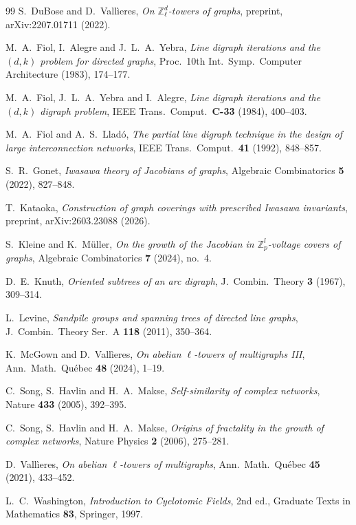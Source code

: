 \documentclass[11pt]{article}
\theoremstyle{plain}
\theoremstyle{remark}
\newcommand{\Z}{\mathbb{Z}}
\begin{document}
\begin{thebibliography}{99}
 S.~DuBose and D.~Vall\`ieres,
\emph{On $\Z_\ell^{d}$-towers of graphs}, preprint, arXiv:2207.01711 (2022).

 M.~A.~Fiol, I.~Alegre and J.~L.~A.~Yebra,
\emph{Line digraph iterations and the $(d,k)$ problem for directed graphs},
Proc.\ 10th Int.\ Symp.\ Computer Architecture (1983), 174--177.

 M.~A.~Fiol, J.~L.~A.~Yebra and I.~Alegre,
\emph{Line digraph iterations and the $(d,k)$ digraph problem},
IEEE Trans.\ Comput.\ \textbf{C-33} (1984), 400--403.

 M.~A.~Fiol and A.~S.~Llad\'o,
\emph{The partial line digraph technique in the design of large interconnection networks},
IEEE Trans.\ Comput.\ \textbf{41} (1992), 848--857.

 S.~R.~Gonet,
\emph{Iwasawa theory of Jacobians of graphs},
Algebraic Combinatorics \textbf{5} (2022), 827--848.

 T.~Kataoka,
\emph{Construction of graph coverings with prescribed Iwasawa invariants},
preprint, arXiv:2603.23088 (2026).

 S.~Kleine and K.~M\"uller,
\emph{On the growth of the Jacobian in $\Z_p^{l}$-voltage covers of graphs},
Algebraic Combinatorics \textbf{7} (2024), no.~4.

 D.~E.~Knuth,
\emph{Oriented subtrees of an arc digraph},
J.\ Combin.\ Theory \textbf{3} (1967), 309--314.

 L.~Levine,
\emph{Sandpile groups and spanning trees of directed line graphs},
J.\ Combin.\ Theory Ser.~A \textbf{118} (2011), 350--364.

 K.~McGown and D.~Vall\`ieres,
\emph{On abelian $\ell$-towers of multigraphs III},
Ann.\ Math.\ Qu\'ebec \textbf{48} (2024), 1--19.

 C.~Song, S.~Havlin and H.~A.~Makse,
\emph{Self-similarity of complex networks},
Nature \textbf{433} (2005), 392--395.

 C.~Song, S.~Havlin and H.~A.~Makse,
\emph{Origins of fractality in the growth of complex networks},
Nature Physics \textbf{2} (2006), 275--281.

 D.~Vall\`ieres,
\emph{On abelian $\ell$-towers of multigraphs},
Ann.\ Math.\ Qu\'ebec \textbf{45} (2021), 433--452.

 L.~C.~Washington,
\emph{Introduction to Cyclotomic Fields}, 2nd ed.,
Graduate Texts in Mathematics \textbf{83}, Springer, 1997.

\end{thebibliography}
\end{document}
